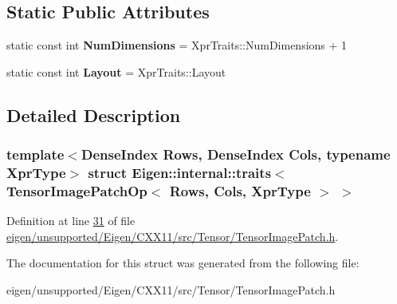 \subsection*{Static Public Attributes}
\begin{DoxyCompactItemize}
\item 
\mbox{\label{struct_eigen_1_1internal_1_1traits_3_01_tensor_image_patch_op_3_01_rows_00_01_cols_00_01_xpr_type_01_4_01_4_ad5b6261852d44d2ad9c2794d08c28268}} 
static const int {\bfseries Num\+Dimensions} = Xpr\+Traits\+::\+Num\+Dimensions + 1
\item 
\mbox{\label{struct_eigen_1_1internal_1_1traits_3_01_tensor_image_patch_op_3_01_rows_00_01_cols_00_01_xpr_type_01_4_01_4_a784cd7f5b59463944258febe1cf3513c}} 
static const int {\bfseries Layout} = Xpr\+Traits\+::\+Layout
\end{DoxyCompactItemize}


\subsection{Detailed Description}
\subsubsection*{template$<$Dense\+Index Rows, Dense\+Index Cols, typename Xpr\+Type$>$\newline
struct Eigen\+::internal\+::traits$<$ Tensor\+Image\+Patch\+Op$<$ Rows, Cols, Xpr\+Type $>$ $>$}



Definition at line \hyperlink{eigen_2unsupported_2_eigen_2_c_x_x11_2src_2_tensor_2_tensor_image_patch_8h_source_l00031}{31} of file \hyperlink{eigen_2unsupported_2_eigen_2_c_x_x11_2src_2_tensor_2_tensor_image_patch_8h_source}{eigen/unsupported/\+Eigen/\+C\+X\+X11/src/\+Tensor/\+Tensor\+Image\+Patch.\+h}.



The documentation for this struct was generated from the following file\+:\begin{DoxyCompactItemize}
\item 
eigen/unsupported/\+Eigen/\+C\+X\+X11/src/\+Tensor/\+Tensor\+Image\+Patch.\+h\end{DoxyCompactItemize}

